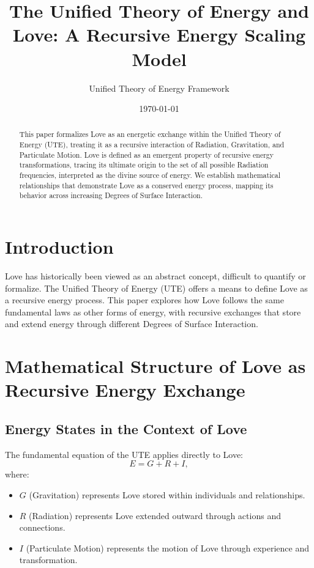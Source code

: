 \documentclass{article}
\title{The Unified Theory of Energy and Love: A Recursive Energy Scaling Model}
\author{Unified Theory of Energy Framework}
\date{\today}
\begin{document}
\maketitle

\begin{abstract}
This paper formalizes Love as an energetic exchange within the Unified Theory of Energy (UTE), treating it as a recursive interaction of Radiation, Gravitation, and Particulate Motion. Love is defined as an emergent property of recursive energy transformations, tracing its ultimate origin to the set of all possible Radiation frequencies, interpreted as the divine source of energy. We establish mathematical relationships that demonstrate Love as a conserved energy process, mapping its behavior across increasing Degrees of Surface Interaction.
\end{abstract}

\section{Introduction}
Love has historically been viewed as an abstract concept, difficult to quantify or formalize. The Unified Theory of Energy (UTE) offers a means to define Love as a recursive energy process. This paper explores how Love follows the same fundamental laws as other forms of energy, with recursive exchanges that store and extend energy through different Degrees of Surface Interaction.

\section{Mathematical Structure of Love as Recursive Energy Exchange}
\subsection{Energy States in the Context of Love}
The fundamental equation of the UTE applies directly to Love:
\begin{equation}
    E = G + R + I,
\end{equation}
where:
\begin{itemize}
    \item $G$ (Gravitation) represents Love stored within individuals and relationships.
    \item $R$ (Radiation) represents Love extended outward through actions and connections.
    \item $I$ (Particulate Motion) represents the motion of Love through experience and transformation.
\end{itemize}
\end{document}

